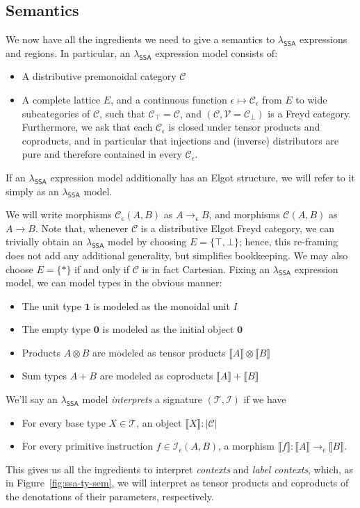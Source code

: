 \documentclass[acmsmall,screen,review]{acmart}
\newcommand{\mc}[1]{\ensuremath{\mathcal{#1}}}
\newcommand{\mb}[1]{\ensuremath{\mathbf{#1}}}
\newcommand{\ms}[1]{\ensuremath{\mathsf{#1}}}
\newcommand{\dnt}[1]{\llbracket{#1}\rrbracket}
\newcommand{\isotopessa}{\(\lambda_{\ms{SSA}}\)}
\begin{document}
\subsection{Semantics}

We now have all the ingredients we need to give a semantics to \isotopessa{} expressions and regions.
In particular, an \isotopessa{} expression model consists of:
\begin{itemize}
  \item A distributive premonoidal category $\mc{C}$
  \item A complete lattice $E$, and a continuous function $\epsilon \mapsto \mc{C}_\epsilon$ from
  $E$ to wide subcategories of $\mc{C}$, such that $\mc{C}_\top = \mc{C}$, and $(\mc{C}, \mc{V} =
  \mc{C}_\bot)$ is a Freyd category. Furthermore, we ask that each $\mc{C}_\epsilon$ is closed under
  tensor products and coproducts, and in particular that injections and (inverse) distributors are
  pure and therefore contained in every $\mc{C}_\epsilon$.
\end{itemize}
If an \isotopessa{} expression model additionally has an Elgot structure, we will refer to it simply
as an \isotopessa{} model.

We will write morphisms $\mc{C}_\epsilon(A, B)$ as $A \to_\epsilon B$, and morphisms $\mc{C}(A, B)$
as $A \to B$. Note that, whenever $\mc{C}$ is a distributive Elgot Freyd category, we can trivially
obtain an \isotopessa{} model by choosing $E = \{\top, \bot\}$; hence, this re-framing does not add
any additional generality, but simplifies bookkeeping. We may also choose $E = \{*\}$ if and only if
$\mc{C}$ is in fact Cartesian.
%
Fixing an \isotopessa{} expression model, we can model types in the obvious manner: 
\begin{itemize}
  \item The unit type $\mb{1}$ is modeled as the monoidal unit $I$
  \item The empty type $\mb{0}$ is modeled as the initial object $\mb{0}$
  \item Products $A \otimes B$ are modeled as tensor products $\dnt{A} \otimes \dnt{B}$
  \item Sum types $A + B$ are modeled as coproducts $\dnt{A} + \dnt{B}$
\end{itemize}
We'll say an \isotopessa{} model \emph{interprets} a signature $(\mc{T}, \mc{I})$ if we have
\begin{itemize}
  \item For every base type $X \in \mc{T}$, an object $\dnt{X} : |\mc{C}|$
  \item For every primitive instruction $f \in \mc{I}_\epsilon(A, B)$, a morphism $\dnt{f} : \dnt{A}
  \to_\epsilon \dnt{B}$.
\end{itemize}
This gives us all the ingredients to interpret \emph{contexts} and \emph{label contexts}, which, as
in Figure~\ref{fig:ssa-ty-sem}, we will interpret as tensor products and coproducts of the
denotations of their parameters, respectively.
\end{document}
